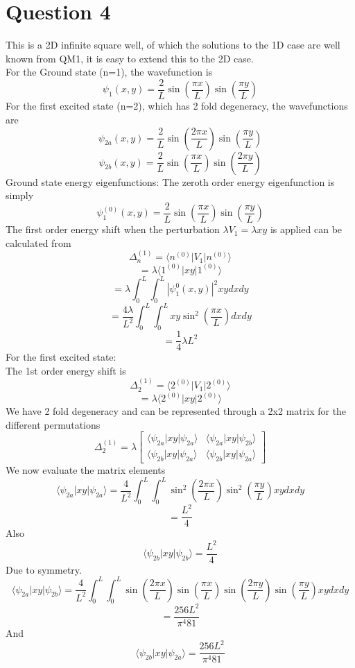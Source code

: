 \documentclass[12pt]{article}
\begin{document}
\section*{Question 4}
This is a 2D infinite square well, of which the solutions  to the 1D case are well known from QM1, it is easy to extend this to the 2D case. 
\\
For the Ground state (n=1), the wavefunction is 
$$ \psi_1 (x,y) = \frac{2}{L} \sin (\frac{ \pi x}{L}) \sin (\frac{\pi y}{L}) $$
For the first excited state (n=2), which has 2 fold degeneracy, the wavefunctions are 
$$ \psi_{2a} (x,y) = \frac{2}{L} \sin (\frac{ 2 \pi x}{L}) \sin (\frac{\pi y }{L}) $$
$$ \psi_{2b} (x,y) = \frac{2}{L} \sin (\frac{\pi x }{L}) \sin ( \frac{ 2 \pi y}{L} ) $$
Ground state energy eigenfunctions: The zeroth order energy eigenfunction is simply 
$$ \psi_1^{(0)}  (x,y) = \frac{2}{L} \sin (\frac{ \pi x}{L}) \sin (\frac{\pi y}{L}) $$
The first order energy shift when the perturbation $\lambda V_1 = \lambda xy$ is applied can be calculated from 
$$ \Delta_n^{(1)} = \langle n^{(0)} | V_1 | n^{(0)} \rangle $$
$$ = \lambda \langle 1^{(0)} | xy | 1^{(0)} \rangle $$
$$ = \lambda \int_0^L \int_0^L |\psi_1^0 (x,y) |^2 xy dx dy $$
$$ = \frac{4 \lambda}{L^2} \int_0^L \int_0^L xy \sin^2 (\frac{\pi x}{L} ) dx dy $$
$$ = \frac{1}{4} \lambda L^2 $$
For the first excited state: 
\\
The 1st order energy shift is 
$$ \Delta_2^{(1)} = \langle 2^{(0)} | V_1 | 2^{(0)} \rangle $$
$$ = \lambda \langle 2^{(0)} | xy | 2^{(0)} \rangle $$
We have 2 fold degeneracy and can be represented through a 2x2 matrix for the different permutations 
$$ \Delta_2^{(1)} = \lambda \begin{bmatrix}
    \langle \psi_{2a} | xy | \psi_{2a} \rangle & \langle \psi_{2a} | xy | \psi_{2b} \rangle \\
    \langle \psi_{2b} | xy | \psi_{2a} \rangle & \langle \psi_{2b} | xy | \psi_{2a} \rangle 
\end{bmatrix} $$
We now evaluate the matrix elements 
$$ \langle \psi_{2a} | xy | \psi_{2a} \rangle = \frac{4}{L^2} \int_0^{L} \int_0^L \sin^2 (\frac{2 \pi x}{L} ) \sin^2 (\frac{ \pi y}{L}) xy dx dy $$
$$ = \frac{L^2}{4} $$
Also
$$ \langle \psi_{2b} | xy | \psi_{2b} \rangle = \frac{L^2}{4} $$
Due to symmetry. 
$$ \langle \psi_{2a} | xy | \psi_{2b} \rangle = \frac{4}{L^2} \int_0^L \int_0^L \sin (\frac{2 \pi x}{L}) \sin (\frac{\pi x}{L} ) \sin (\frac{2 \pi y}{L} ) \sin (\frac{\pi y}{L}) xy dx dy $$
$$ = \frac{256 L^2 }{\pi^4 81} $$
And 
$$ \langle \psi_{2b} | xy | \psi_{2a} \rangle = \frac{256 L^2 }{\pi^4 81} $$
\end{document}
